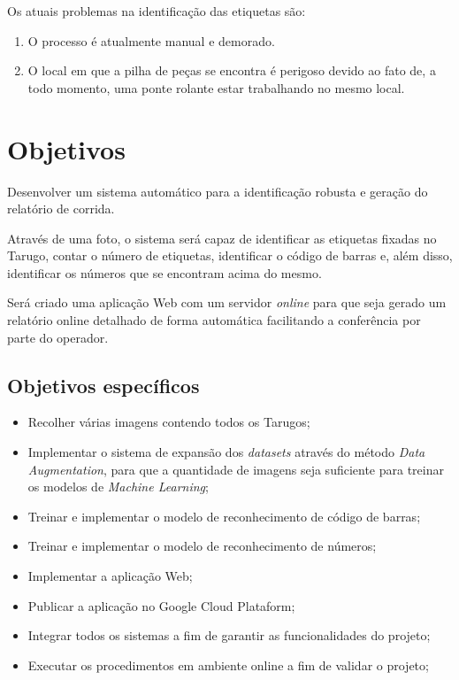 Os atuais problemas na identificação das etiquetas são: 
\begin{enumerate}
	\item O processo é atualmente manual e demorado.
	\item O local em que a pilha de peças se encontra é perigoso devido ao fato de, a todo momento, uma ponte rolante estar trabalhando no mesmo local.
\end{enumerate}


\section{Objetivos} 

Desenvolver um sistema automático para a identificação robusta e geração do relatório de corrida.

Através de uma foto, o sistema será capaz de identificar as etiquetas fixadas no Tarugo, contar o número de etiquetas, identificar o código de barras e, além disso, identificar os números que se encontram acima do mesmo.

Será criado uma aplicação Web com um servidor \textit{online} para que seja gerado um relatório  online detalhado de forma automática facilitando a conferência por parte do operador.

\subsection{Objetivos específicos}

\begin{itemize}
	\item Recolher várias imagens contendo todos os Tarugos;
	\item Implementar o sistema de expansão dos \textit{datasets} através do método \textit{Data Augmentation}, para que a quantidade de imagens seja suficiente para treinar os modelos de \textit{Machine Learning};
	\item Treinar e implementar o modelo de reconhecimento de código de barras;
	\item Treinar e implementar o modelo de reconhecimento de números;
	\item Implementar a aplicação Web;
	\item Publicar a aplicação no Google Cloud Plataform;
	\item Integrar todos os sistemas a fim de garantir as funcionalidades do projeto;
	\item Executar os procedimentos em ambiente online a fim de validar o projeto;
\end{itemize}

